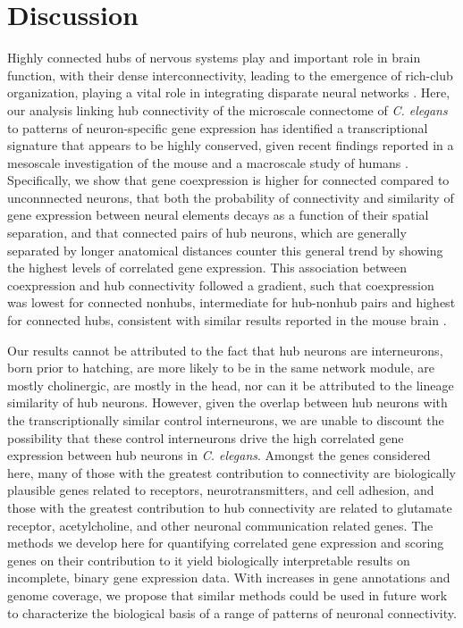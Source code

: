 \documentclass[10pt,letterpaper]{article}
\begin{document}
{\section*{Discussion}
Highly connected hubs of nervous systems play and important role in brain function, with their dense interconnectivity, leading to the emergence of rich-club organization, playing a vital role in integrating disparate neural networks \cite{vandenHeuvel:2013ge, Fornito:2015dq, deReus:2013cy, vandenHeuvel:2013ij}.
Here, our analysis linking hub connectivity of the microscale connectome of \emph{C. elegans} to patterns of neuron-specific gene expression has identified a transcriptional signature that appears to be highly conserved, given recent findings reported in a mesoscale investigation of the mouse \cite{Fulcher:2016ck} and a macroscale study of humans \cite{Vertes:2016in}.
Specifically, we show that gene coexpression is higher for connected compared to unconnnected neurons, that both the probability of connectivity and similarity of gene expression between neural elements decays as a function of their spatial separation, and that connected pairs of hub neurons, which are generally separated by longer anatomical distances counter this general trend by showing the highest levels of correlated gene expression.
This association between coexpression and hub connectivity followed a gradient, such that coexpression was lowest for connected nonhubs, intermediate for hub-nonhub pairs and highest for connected hubs, consistent with similar results reported in the mouse brain \cite{Fulcher:2016ck}.

Our results cannot be attributed to the fact that hub neurons are interneurons, born prior to hatching, are more likely to be in the same network module, are mostly cholinergic, are mostly in the head, nor can it be attributed to the lineage similarity of hub neurons.
However, given the overlap between hub neurons with the transcriptionally similar control interneurons, we are unable to discount the possibility that these control interneurons drive the high correlated gene expression between hub neurons in \emph{C. elegans}.
Amongst the genes considered here, many of those with the greatest contribution to connectivity are biologically plausible genes related to receptors, neurotransmitters, and cell adhesion, and those with the greatest contribution to hub connectivity are related to glutamate receptor, acetylcholine, and other neuronal communication related genes.
The methods we develop here for quantifying correlated gene expression and scoring genes on their contribution to it yield biologically interpretable results on incomplete, binary gene expression data.
With increases in gene annotations and genome coverage, we propose that similar methods could be used in future work to characterize the biological basis of a range of patterns of neuronal connectivity.

}
\end{document}
